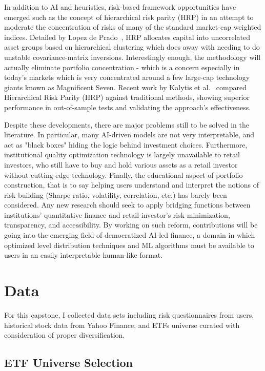 \documentclass[11pt]{article}
\begin{document}
In addition to AI and heuristics, risk-based framework opportunities have emerged such as the concept of hierarchical risk parity (HRP) in an attempt to moderate the concentration of risks of many of the standard market-cap weighted indices. Detailed by Lopez de Prado~\cite{hrp2016}, HRP allocates capital into uncorrelated asset groups based on hierarchical clustering which does away with needing to do unstable covariance-matrix inversions. Interestingly enough, the methodology will actually eliminate portfolio concentration - which is a concern especially in today's markets which is very concentrated around a few large-cap technology giants known as Magnificent Seven. Recent work by Kalytis et al.~\cite{kalytis2024optimizing} compared Hierarchical Risk Parity (HRP) against traditional methods, showing superior performance in out-of-sample tests and validating the approach's effectiveness.

Despite these developments, there are major problems still to be solved in the literature. In particular, many AI-driven models are not very interpretable, and act as "black boxes" hiding the logic behind investment choices. Furthermore, institutional quality optimization technology is largely unavailable to retail investors, who still have to buy and hold various assets as a retail investor without cutting-edge technology. Finally, the educational aspect of portfolio construction, that is to say helping users understand and interpret the notions of risk building (Sharpe ratio, volatility, correlation, etc.) has barely been considered. Any new research should seek to apply bridging functions between institutions' quantitative finance and retail investor's risk minimization, transparency, and accessibility. By working on such reform, contributions will be going into the emerging field of democratized AI-led finance, a domain in which optimized level distribution techniques and ML algorithms must be available to users in an easily interpretable human-like format.

\section{Data}

For this capstone, I collected data sets including risk questionnaires from users, historical stock data from Yahoo Finance, and ETFs universe curated with consideration of proper diversification.


\subsection{ETF Universe Selection}
\end{document}
